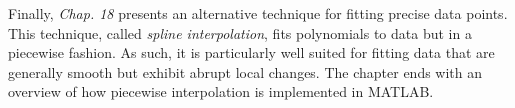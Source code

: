 \documentclass[../main.tex]{subfiles}
\begin{document}
Finally, \textit{Chap. 18} presents an alternative technique for fitting precise data points. This
technique, called \textit{spline interpolation}, fits polynomials to data but in a piecewise fashion.
As such, it is particularly well suited for fitting data that are generally smooth but exhibit
abrupt local changes. The chapter ends with an overview of how piecewise interpolation is
implemented in MATLAB.






\blankpage
\end{document}
